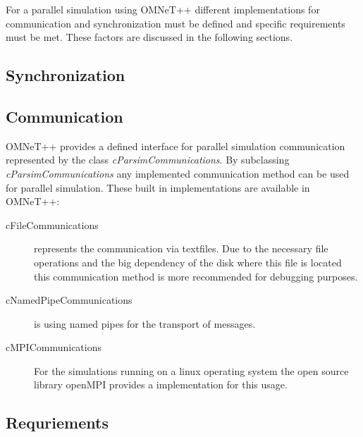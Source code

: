 For a parallel simulation using OMNeT++ different implementations for communication and synchronization must be defined and specific requirements must be met.
These factors are discussed in the following sections.

\subsection{Synchronization}
\label{sec:parallel_omnet_sync}

\subsection{Communication}
\label{sec:parallel_omnet_comm}

OMNeT++ provides a defined interface for parallel simulation communication represented by the class \emph{cParsimCommunications}.
By subclassing \emph{cParsimCommunications} any implemented communication method can be used for parallel simulation.
These built in implementations are available in OMNeT++: \cite{omnet_par_api}

\begin{description}
    \item[cFileCommunications] represents the communication via textfiles.
                               Due to the necessary file operations and the big dependency of the disk where this file is located this communication method is more recommended for debugging purposes.
    \item[cNamedPipeCommunications] is using named pipes for the transport of messages.
    \item[cMPICommunications] 
    For the simulations running on a linux operating system the open source library openMPI provides a implementation for this usage. \cite{openmpi_hp}
\end{description}



\subsection{Requriements}
\label{sec:parallel_omnet_requirements}


